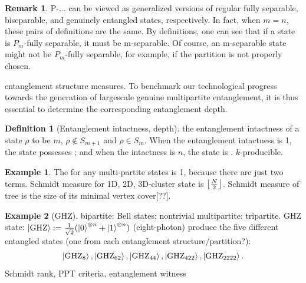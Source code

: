 \documentclass[
10pt,
aps,
pra,
linenumbers,
floatfix,
]{revtex4-2}
\theoremstyle{plain}
\theoremstyle{definition}
\newtheorem{definition}{Definition}
\newtheorem{observation}{Observation}
\newtheorem{example}{Example}
\newtheorem{remark}{Remark}
\newcommand{\ghz}{\text{GHZ}}
\newcommand{\dm}{\rho}
\begin{document}
\begin{remark}
	P-... can be viewed as generalized versions of regular fully separable, biseparable, and genuinely entangled states, respectively.
	In fact, when $m=n$, these pairs of definitions are the same.
	By definitions, one can see that if a state is $P_m$-fully separable, it must be m-separable. Of course, an m-separable state might not be $P_m$-fully separable, for example, if the partition is not properly chosen.
\end{remark}
entanglement structure measures.
To benchmark our technological progress towards the generation of largescale genuine multipartite entanglement, it is thus essential to determine the corresponding entanglement depth.
\begin{definition}[Entanglement intactness, depth]
	the entanglement intactness of a state $\dm$ to be $m$, \iff $\dm\notin S_{m+1}$ and $\dm\in S_m$.
	When the entanglement intactness is 1, the state possesses ; and when the intactness is $n$, the state is .
	$k$-producible.
\end{definition}
\begin{example}
	The  for any multi-partite  states is 1, because there are just two terms.
	Schmidt measure for 1D, 2D, 3D-cluster state is $\left\lfloor \frac{N}{2} \right\rfloor$.
	Schmidt measure of tree is the size of its minimal vertex cover[??].
\end{example}
\begin{example}[GHZ]\label{exm:ghz}
	bipartite: Bell states;
	nontrivial multipartite: tripartite.
	GHZ state: $\ket{\ghz}:=\frac{1}{\sqrt{2}}(\ket{0}^{\otimes n} + \ket{1}^{\otimes n} )$ (eight-photon) produce the five different entangled states (one from each entanglement structure/partition?): 
	\begin{equation*}
		\ket{\ghz_8},\ket{\ghz_{62}},\ket{\ghz_{44}},\ket{\ghz_{422}},\ket{\ghz_{2222}}.
	\end{equation*}
	Schmidt rank, PPT criteria, entanglement witness
\end{example}
\end{document}
